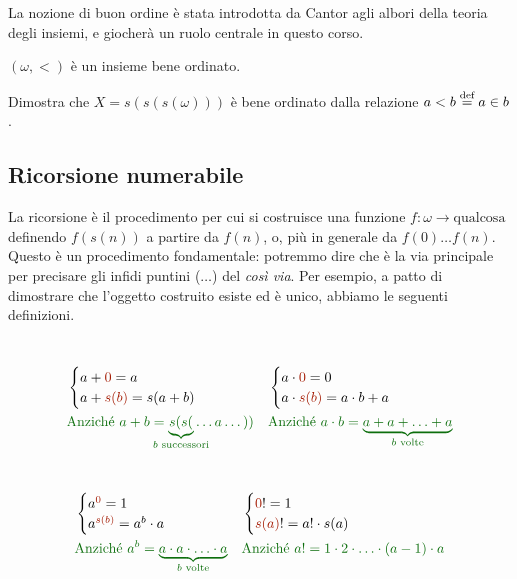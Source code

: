 La nozione di buon ordine \`e stata introdotta da Cantor agli albori della teoria degli insiemi, e giocher\`a un ruolo centrale in questo corso.

\begin{example}
	$(\omega, <)$ \`e un insieme bene ordinato.
\end{example}

\begin{exercise}
	Dimostra che $X = s(s(s(\omega)))$ \`e bene ordinato dalla relazione $a < b \overset{\text{def}}{=} a \in b$.
\end{exercise}

\subsection{Ricorsione numerabile}
La ricorsione \`e il procedimento per cui si costruisce una funzione
$f\colon \omega \to \text{qualcosa}$ definendo $f(s(n))$ a partire da $f(n)$, o,
pi\`u in generale da $f(0)\ldots f(n)$. Questo \`e un procedimento
fondamentale: potremmo dire che \`e la via principale per precisare gli
infidi puntini ($\ldots$) del \textit{cos\`i via}. Per esempio, a patto di
dimostrare che l'oggetto costruito esiste ed \`e unico, abbiamo le
seguenti definizioni.

\begin{definition}\label{def-op-ar}
\ 
\baselineskip
	\begin{align*}
	&\begin{cases}
		a + {\drkred 0} = a \\
		a + {\drkred s(b)} = s(a + b)
	\end{cases}
	&&
	\begin{cases}
		a \cdot {\drkred 0} = 0\\
		a \cdot {\drkred s(b)} = a \cdot b + a
	\end{cases}\\
	&\text{\drkgrn Anzich\'e $a + b =
\underbrace{s(s(}_{\mathclap{\text{$b$ successori}}}
\ldots a \ldots\,))$}
	&&
	\text{\drkgrn Anzich\'e $a \cdot b = \underbrace{a + a + \ldots + a}_{\text{$b$
volte}}$}
	\end{align*}
\end{definition}

\begin{definition}[Potenza e fattoriale]\label{def-pot-fat}
\ 
\baselineskip
	\begin{align*}
	&\begin{cases}
		a^{{\drkred 0}} = 1\\
		a^{{\drkred s(b)}} = a^b \cdot a
	\end{cases}
	&&
	\begin{cases}
		{\drkred 0}! = 1\\
		{\drkred s(a)}! = a! \cdot s(a)
	\end{cases}\\
	&\text{\drkgrn Anzich\'e
$a^b = \underbrace{a \cdot a \cdot \ldots \cdot a}_{\text{$b$ volte}}$}
	&&
	\text{\drkgrn Anzich\'e
$a! = 1 \cdot 2 \cdot \ldots \cdot (a - 1) \cdot a$}
	\end{align*}
\end{definition}


